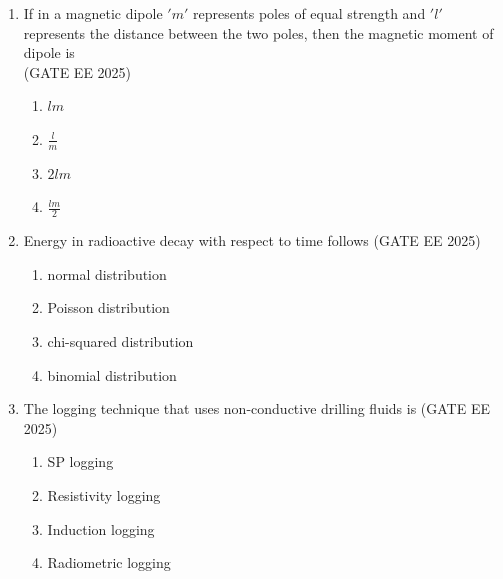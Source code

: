\documentclass[journal]{IEEEtran}
\begin{document}
\begin{enumerate}[start=26]
\begin{enumerate}
\end{enumerate}

\item If in a magnetic dipole $'m'$ represents poles of equal strength and $'l'$ represents the distance between the two poles, then the magnetic moment of dipole is\\
\hfill{(GATE EE 2025)}
\begin{enumerate}
    \item $lm$
    \item $\frac{l}{m}$
    \item $2lm$
    \item $\frac{lm}{2}$
\end{enumerate}

\item  Energy in radioactive decay with respect to time follows
\hfill{(GATE EE 2025)}
\begin{enumerate}
    \item normal distribution
\item Poisson distribution
\item chi-squared distribution
\item binomial distribution
\end{enumerate}

\item The logging technique that uses non-conductive drilling fluids is
\hfill{(GATE EE 2025)}
\begin{enumerate}
 \item  SP logging
\item  Resistivity logging
\item Induction logging
\item Radiometric logging
\end{enumerate}


\end{enumerate}
\end{document}
